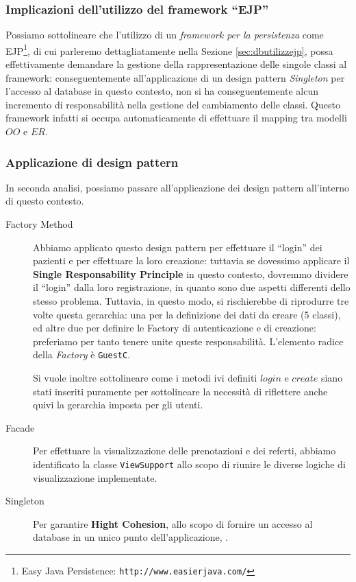 \subsubsection{Implicazioni dell'utilizzo del framework ``EJP''}
Possiamo sottolineare che l'utilizzo di un \textit{framework per la persistenza}
come EJP\footnote{Easy Java Persistence: \texttt{http://www.easierjava.com/}}, 
di cui parleremo dettagliatamente  nella Sezione \vref{sec:dbutilizzejp},
possa effettivamente demandare la gestione della rappresentazione delle singole
classi al framework: conseguentemente all'applicazione di un design pattern \textit{Singleton}
per l'accesso al database in questo contesto, non si ha conseguentemente alcun
incremento di
responsabilità nella gestione del cambiamento delle classi. Questo framework
infatti si occupa automaticamente di effettuare il mapping tra modelli $OO$ e $ER$.


\subsubsection{Applicazione di design pattern}\label{subsubsec:applydesignpatt}
In seconda analisi, possiamo passare all'applicazione dei design pattern all'interno
di questo contesto.

\begin{description}
\item[Factory Method] Abbiamo applicato questo design pattern per effettuare 
	il ``login'' dei pazienti e per effettuare la loro creazione: tuttavia
	se dovessimo applicare il \textbf{Single Responsability Principle} in
	questo contesto, dovremmo dividere il ``login'' dalla loro registrazione,
	in quanto sono due aspetti differenti dello stesso problema. Tuttavia,
	in questo modo, si rischierebbe di riprodurre tre volte questa gerarchia:
	una per la definizione dei dati da creare (5 classi), ed altre due 
	per definire le Factory di autenticazione e di creazione: preferiamo
	per tanto tenere unite queste responsabilità. L'elemento radice della
	\textit{Factory} è \texttt{GuestC}. 
	
	Si vuole inoltre sottolineare come i metodi
	ivi definiti $login$ e $create$ siano stati inseriti puramente per sottolineare
	la necessità di riflettere anche quivi la gerarchia imposta per gli utenti.
\item[Facade] Per effettuare la visualizzazione delle prenotazioni e dei referti,
	abbiamo identificato la classe \texttt{ViewSupport} allo scopo di riunire
	le diverse logiche di visualizzazione implementate. 
\item[Singleton] Per garantire \textbf{Hight Cohesion}, allo scopo di fornire un
	accesso al database in un unico punto dell'applicazione, .
\end{description}
\bigskip

